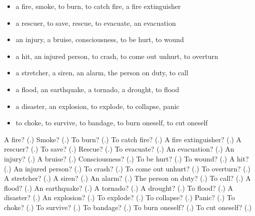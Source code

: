 \begin{itemize}
\raggedright
  \item a fire, smoke, to burn, to catch fire, a fire extinguisher
  \item a rescuer, to save, rescue, to evacuate, an evacuation
  \item an injury, a bruise, consciousness, to be hurt, to wound
  \item a hit, an injured person, to crash, to come out unhurt, to overturn
  \item a stretcher, a siren, an alarm, the person on duty, to call
  \item a flood, an earthquake, a tornado, a drought, to flood
  \item a disaster, an explosion, to explode, to collapse, panic
  \item to choke, to survive, to bandage, to burn oneself, to cut oneself
\end{itemize}

\begin{tcolorbox}[breakable,colback=teal!4,colframe=teal!35!black,title={Before you move on}]
A fire? (\textbf{}.) Smoke? (\textbf{}.) To burn? (\textbf{}.) To catch fire? (\textbf{}.) A fire extinguisher? (\textbf{}.) A rescuer? (\textbf{}.) To save? (\textbf{}.) Rescue? (\textbf{}.) To evacuate? (\textbf{}.) An evacuation? (\textbf{}.) An injury? (\textbf{}.) A bruise? (\textbf{}.) Consciousness? (\textbf{}.) To be hurt? (\textbf{}.) To wound? (\textbf{}.) A hit? (\textbf{}.) An injured person? (\textbf{}.) To crash? (\textbf{}.) To come out unhurt? (\textbf{}.) To overturn? (\textbf{}.) A stretcher? (\textbf{}.) A siren? (\textbf{}.) An alarm? (\textbf{}.) The person on duty? (\textbf{}.) To call? (\textbf{}.) A flood? (\textbf{}.) An earthquake? (\textbf{}.) A tornado? (\textbf{}.) A drought? (\textbf{}.) To flood? (\textbf{}.) A disaster? (\textbf{}.) An explosion? (\textbf{}.) To explode? (\textbf{}.) To collapse? (\textbf{}.) Panic? (\textbf{}.) To choke? (\textbf{}.) To survive? (\textbf{}.) To bandage? (\textbf{}.) To burn oneself? (\textbf{}.) To cut oneself? (\textbf{}.)
\end{tcolorbox}
